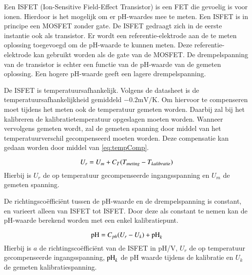 Een ISFET (Ion-Sensitive Field-Effect Transistor) is een FET die gevoelig is voor ionen. Hierdoor is het mogelijk om er pH-waardes mee te meten\cite{modeling}. Een ISFET is in principe een MOSFET zonder gate. De ISFET gedraagt zich in de eerste instantie ook als transistor. Er wordt een referentie-elektrode aan de te meten oplossing toegevoegd om de pH-waarde te kunnen meten. Deze referentie-elektrode kan gebruikt worden als de gate van de MOSFET\cite{van1987isfet}. De drempelspanning van de transistor is echter een functie van de pH-waarde van de gemeten oplossing. Een hogere pH-waarde geeft een lagere drempelspanning\cite{isfet}.

De ISFET is temperatuursafhankelijk\cite{isfet}. Volgens de datasheet is de temperatuursafhankelijkheid gemiddeld $-0.2\si{\milli\volt\per\kelvin}$\cite{Microsens-MSFET}. Om hiervoor te compenseren moet tijdens het meten ook de temperatuur gemeten worden. Daarbij zal bij het kalibreren de kalibratietemperatuur opgeslagen moeten worden. Wanneer vervolgens gemeten wordt, zal de gemeten spanning door middel van het temperatuurverschil gecompenseerd moeten worden. Deze compensatie kan gedaan worden door middel van \cref{eq:tempComp}.

\begin{equation}\label{eq:tempComp}
    U_r = U_m + C_T(T_{meting} - T_{kalibratie})
    \tagaddtext{[\si{\volt}]}
\end{equation}
Hierbij is $U_r$ de op temperatuur gecompenseerde ingangsspanning en $U_m$ de gemeten spanning.

De richtingscoëfficiënt tussen de pH-waarde en de drempelspanning is constant, en varieert alleen van ISFET tot ISFET. Door deze als constant te nemen kan de pH-waarde berekend worden met een enkel kalibratiepunt.

\begin{equation}\label{eq:calcPH}
    \ph = C_{ph}(U_r - U_k) + \ph_k
    \tagaddtext{[pH]}
\end{equation}
Hierbij is $a$ de richtingscoëfficiënt van de ISFET in pH/V, $U_r$ de op temperatuur gecompenseerde ingangsspanning, $\mathrm{pH}_k$ de pH waarde tijdens de kalibratie en $U_k$ de gemeten kalibratiespanning.